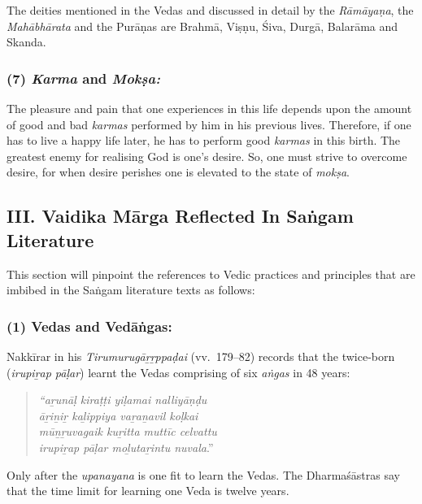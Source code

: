 \vskip -7pt

The deities mentioned in the Vedas and discussed in detail by the \textit{Rāmāyaṇa}, the \textit{Mahābhārata} and the Purāṇas are Brahmā, Viṣṇu, Śiva, Durgā, Balarāma and Skanda.


\subsubsection*{(7) \textit{Karma} and \textit{Mokṣa:}}

\vskip -7pt

The pleasure and pain that one experiences in this life depends upon the amount of good and bad \textit{karmas} performed by him in his previous lives. Therefore, if one has to live a happy life later, he has to perform good \textit{karmas} in this birth. The greatest enemy for realising God is one’s desire. So, one must strive to overcome desire, for when desire perishes one is elevated to the state of \textit{mokṣa}.


\subsection*{III. Vaidika Mārga Reflected In Saṅgam Literature}

\vskip -7pt

This section will pinpoint the references to Vedic practices and principles that are imbibed in the Saṅgam literature texts as follows:

\subsubsection*{(1) Vedas and Vedāṅgas:}

\vskip -7pt

Nakkīrar in his \textit{Tirumurugāṟṟppaḍai} (vv.~179–82) records that the twice-born (\textit{irupiṟap pāḷar}) learnt the Vedas comprising of six \textit{aṅgas} in 48 years:

\begin{quote}
\textit{“aṟunāḷ kiraṭṭi yiḷamai nalliyāṇḍu}\\\textit{āṟiṉiṟ kaḻippiya vaṟaṉavil koḷkai}\\\textit{mūṉṟuvagaik kuṟitta muttīc celvattu}\\\textit{irupiṟap pāḷar moḻutaṟintu nuvala}.”
\end{quote}

Only after the \textit{upanayana} is one fit to learn the Vedas. The Dharmaśāstras say that the time limit for learning one Veda is twelve years.

